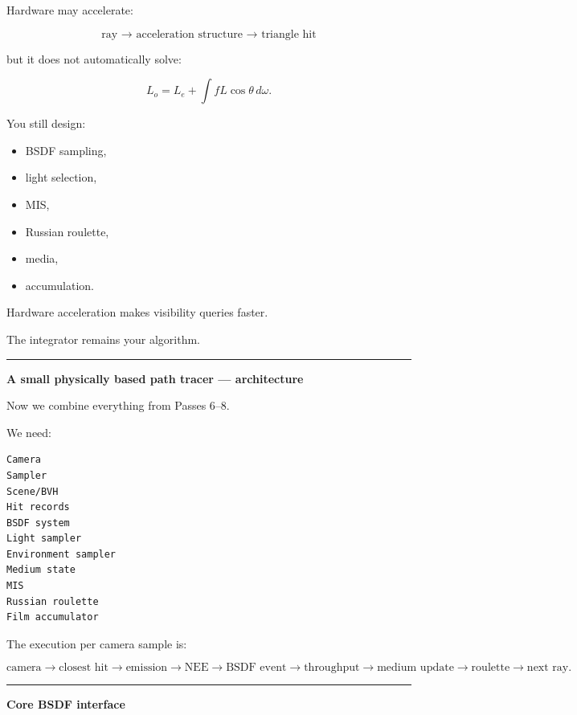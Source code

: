 Hardware may accelerate:

\[
\boxed{
\text{ray → acceleration structure → triangle hit}
}
\]

but it does not automatically solve:

\[
L_o=
L_e+
\int fL\cos\theta\,d\omega.
\]

You still design:

\begin{itemize}
\tightlist
\item
  BSDF sampling,
\item
  light selection,
\item
  MIS,
\item
  Russian roulette,
\item
  media,
\item
  accumulation.
\end{itemize}

Hardware acceleration makes visibility queries faster.

The integrator remains your algorithm.

\begin{center}\rule{0.5\linewidth}{0.5pt}\end{center}

\textbf{A small physically based path tracer --- architecture}

Now we combine everything from Passes 6--8.

We need:

\begin{verbatim}
Camera
Sampler
Scene/BVH
Hit records
BSDF system
Light sampler
Environment sampler
Medium state
MIS
Russian roulette
Film accumulator
\end{verbatim}

The execution per camera sample is:

\[
\text{camera}
\rightarrow
\text{closest hit}
\rightarrow
\text{emission}
\rightarrow
\text{NEE}
\rightarrow
\text{BSDF event}
\rightarrow
\text{throughput}
\rightarrow
\text{medium update}
\rightarrow
\text{roulette}
\rightarrow
\text{next ray}.
\]

\begin{center}\rule{0.5\linewidth}{0.5pt}\end{center}

\textbf{Core BSDF interface}

